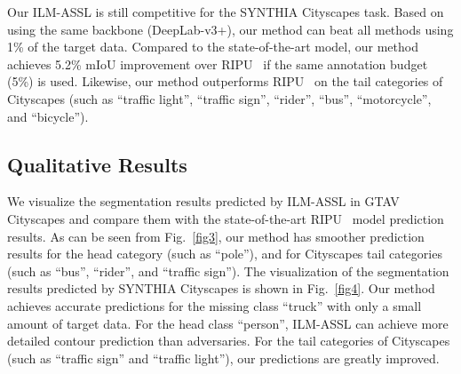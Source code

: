 \documentclass[journal]{IEEEtran}
\newcommand{\fref}[1]{Fig.~\ref{#1}}
\newcommand{\method}{ILM-ASSL\xspace}
\begin{document}
Our \method is still competitive for the SYNTHIA  Cityscapes task. Based on using the same backbone (DeepLab-v3+), our method can beat all methods using 1\% of the target data. Compared to the state-of-the-art model, our method achieves 5.2\% mIoU improvement over RIPU~\cite{xie2022towards} if the same annotation budget (5\%) is used. Likewise, our method outperforms RIPU~\cite{xie2022towards} on the tail categories of Cityscapes (such as ``traffic light'', ``traffic sign'', ``rider'', ``bus'', ``motorcycle'', and ``bicycle'').

\begin{table}[t]
  \centering
  \caption{Ablation study on the effectiveness of various components.}
  \label{tab3}
  \vspace{-2mm}
  \vspace{-3mm}
\end{table}


\subsection{Qualitative Results}
\label{sec:qualitative_results}

We visualize the segmentation results predicted by \method in GTAV  Cityscapes and compare them with the state-of-the-art RIPU~\cite{xie2022towards} model prediction results. As can be seen from \fref{fig3}, our method has smoother prediction results for the head category (such as ``pole''), and for Cityscapes tail categories (such as ``bus'', ``rider'', and ``traffic sign''). The visualization of the segmentation results predicted by SYNTHIA  Cityscapes is shown in \fref{fig4}. Our method achieves accurate predictions for the missing class ``truck'' with only a small amount of target data. For the head class ``person'', \method can achieve more detailed contour prediction than adversaries. For the tail categories of Cityscapes (such as ``traffic sign'' and ``traffic light''), our predictions are greatly improved. 
\end{document}
